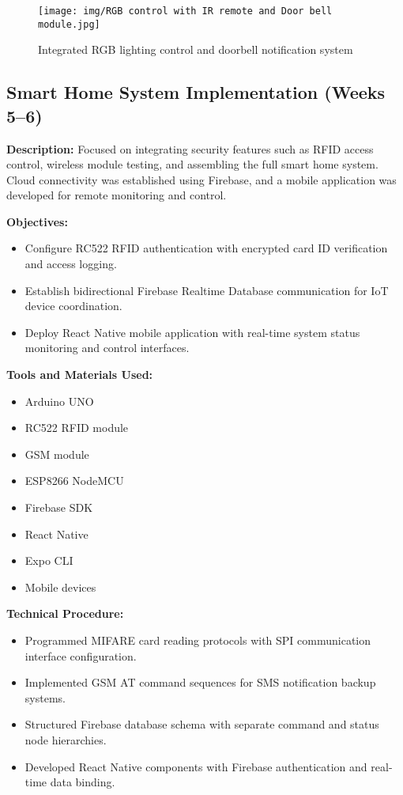 \documentclass[12pt,a4paper]{report}
\begin{document}
\begin{figure}[H]
\centering
\texttt{[image: img/RGB control with IR remote and Door bell module.jpg]}
\caption{Integrated RGB lighting control and doorbell notification system}
\label{fig:rgb-doorbell}
\end{figure}

\subsection{Smart Home System Implementation (Weeks 5--6)}

\noindent\textbf{Description:} Focused on integrating security features such as RFID access control, wireless module testing, and assembling the full smart home system. Cloud connectivity was established using Firebase, and a mobile application was developed for remote monitoring and control.

\noindent\textbf{Objectives:}
\begin{itemize}
    \item Configure RC522 RFID authentication with encrypted card ID verification and access logging.
    \item Establish bidirectional Firebase Realtime Database communication for IoT device coordination.
    \item Deploy React Native mobile application with real-time system status monitoring and control interfaces.
\end{itemize}

\noindent\textbf{Tools and Materials Used:}
\begin{multicols}{2}
\begin{itemize}
    \item Arduino UNO
    \item RC522 RFID module
    \item GSM module
    \item ESP8266 NodeMCU
    \item Firebase SDK
    \item React Native
    \item Expo CLI
    \item Mobile devices
\end{itemize}
\end{multicols}

\noindent\textbf{Technical Procedure:}
\begin{itemize}
    \item Programmed MIFARE card reading protocols with SPI communication interface configuration.
    \item Implemented GSM AT command sequences for SMS notification backup systems.
    \item Structured Firebase database schema with separate command and status node hierarchies.
    \item Developed React Native components with Firebase authentication and real-time data binding.
\end{itemize}
\end{document}
